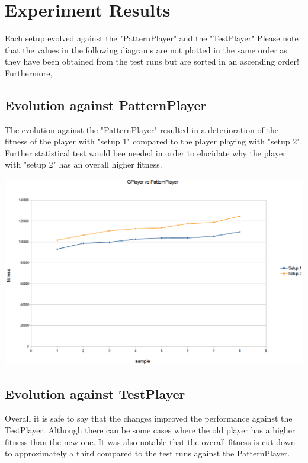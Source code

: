 \documentclass[12pt,fleqn,a4paper]{article}
\begin{document}
\section{Experiment Results}
\label{sec:expres}
Each setup evolved against the "PatternPlayer" and the "TestPlayer"  
Please note that the values in the following diagrams are not plotted in the same order as they have been obtained from the test runs but are sorted in an ascending order!\\
Furthermore, 

\subsection{Evolution against PatternPlayer}
The evolution against the "PatternPlayer" resulted in a deterioration of the fitness of the player with "setup 1" compared to the player playing with "setup 2".\\
Further statistical test would bee needed in order to elucidate why the player with "setup 2" has an overall higher fitness.

\begin{center}
	\includegraphics[width=.7\textwidth]{gp_vs_pp_new.png}
\end{center}

\subsection{Evolution against TestPlayer}
Overall it is safe to say that the changes improved the performance against the TestPlayer. Although there can be some cases where the old player has a higher fitness than the new one. It was also notable that the overall fitness is cut down to approximately a third compared to the test runs against the PatternPlayer.
\end{document}
